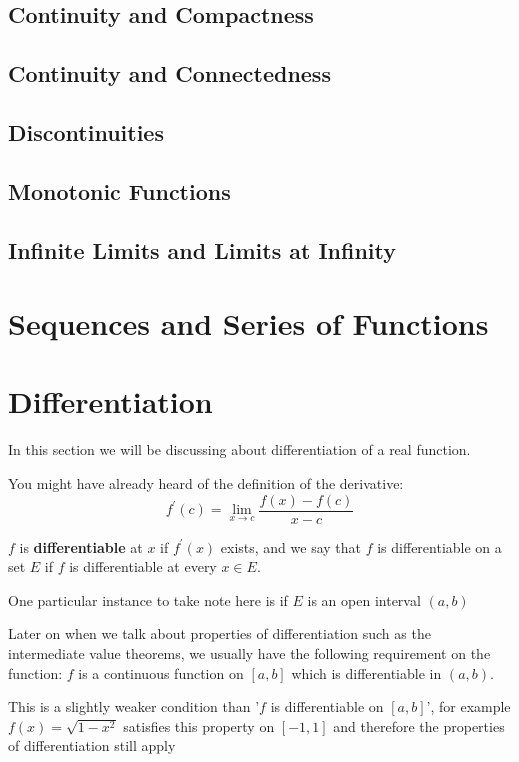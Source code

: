 \section{Continuity and Compactness}

\section{Continuity and Connectedness}

\section{Discontinuities}

\section{Monotonic Functions}

\section{Infinite Limits and Limits at Infinity}

\chapter{Sequences and Series of Functions}

\chapter{Differentiation}
In this section we will be discussing about differentiation of a real function.

You might have already heard of the definition of the derivative:
\[ f^\prime(c)=\lim_{x\to c}\frac{f(x)-f(c)}{x-c} \]

$f$ is \textbf{differentiable} at $x$ if $f^\prime(x)$ exists, and we say that $f$ is differentiable on a set $E$ if $f$ is differentiable at every $x \in E$.

One particular instance to take note here is if $E$ is an open interval $(a,b)$

Later on when we talk about properties of differentiation such as the intermediate value theorems, we usually have the following requirement on the function:
$f$ is a continuous function on $[a,b]$ which is differentiable in $(a,b)$.

This is a slightly weaker condition than '$f$ is differentiable on $[a,b]$', for example $f(x)=\sqrt{1-x^2}$ satisfies this property on $[-1,1]$ and therefore the properties of differentiation still apply

